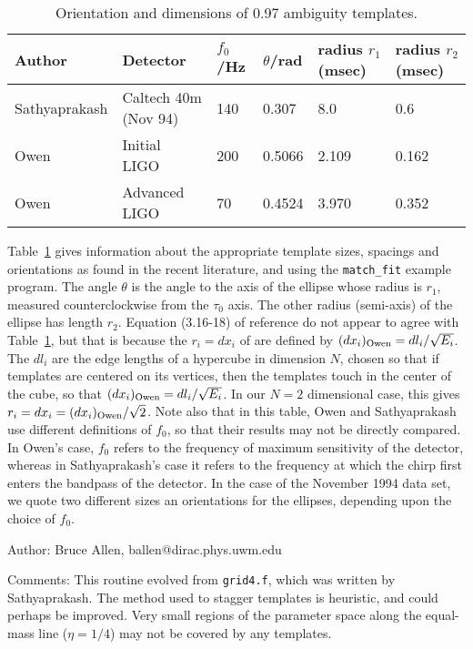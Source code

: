 \begin{table}
\begin{tabular}[]{llllll}
Author        &   Detector             &   $f_0$/Hz     &   $\theta$/rad &   radius $ r_1$ (msec)  &   radius $r_2$ (msec)\\
\hline
Sathyaprakash &  Caltech 40m  (Nov 94) &   140          &   0.307        &    8.0                 &     0.6             \\
Owen          & Initial LIGO           &   200          &   0.5066       &    2.109               &     0.162            \\
Owen          & Advanced LIGO          &   70           &   0.4524       &    3.970               &     0.352                        
\end{tabular}
\caption{\label{t:ellipse} Orientation and dimensions of 0.97 ambiguity
templates.}
\end{table}
Table~\ref{t:ellipse} gives information about the appropriate template
sizes, spacings and orientations as found in the recent literature,
and using the {\tt match\_fit} example program.
The angle $\theta$ is the angle to the axis of the ellipse whose radius is
$r_1$, measured counterclockwise from the $\tau_0$ axis.  The
other radius (semi-axis) of the ellipse has length $r_2$.
Equation (3.16-18) of reference
\cite{Owen} do not appear to agree with Table~\ref{t:ellipse}, but that
is because the $r_i = dx_i$ of \cite{Owen} are defined by $(dx_i)_{\rm Owen}
= dl_i/\sqrt{E_i}$.  The $dl_i$ are the edge lengths of a hypercube
in dimension $N$, chosen so that if templates are centered on its
vertices, then the templates touch in the center of the cube, so that
$(dx_i)_{\rm Owen} = dl_i/\sqrt{E_i}$.  In our $N=2$ dimensional case,
this gives $r_i = dx_i=(dx_i)_{\rm Owen}/\sqrt{2}$.  Note also that in this
table, Owen and Sathyaprakash use different definitions of $f_0$,
so that their results may not be directly compared.  In Owen's case,
$f_0$ refers to the frequency of maximum sensitivity of the detector,
whereas in Sathyaprakash's case it refers to the frequency at which the
chirp first enters the bandpass of the detector.  In the case of the
November 1994 data set, we quote two different sizes an orientations
for the ellipses, depending upon the choice of $f_0$.
\begin{description}
\item{Author:}
Bruce Allen, ballen@dirac.phys.uwm.edu
\item{Comments:}
This routine evolved from {\tt grid4.f}, which was written by Sathyaprakash.
The method used to stagger templates is heuristic, and could perhaps
be improved. Very small regions of the parameter space along the equal-mass
line ($\eta=1/4$) may not be covered by any templates.
\end{description}
\clearpage

